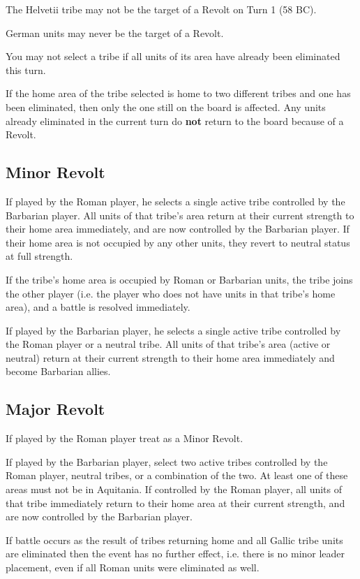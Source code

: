The Helvetii tribe may not be the target of a Revolt on Turn 1 (58 BC).

German units may never be the target of a Revolt.

You may not select a tribe if all units of its area have already been eliminated this turn.

If the home area of the tribe selected is home to two different tribes and one has been eliminated, then only the one still on the board is affected. Any units already eliminated in the current turn do \textbf{not} return to the board because of a Revolt.

\subsection{Minor Revolt}
If played by the Roman player, he selects a single active tribe controlled
by the Barbarian player. All units of that tribe's area return at their current strength to their home area immediately, and are now controlled by the Barbarian player. If their home area is not occupied by any other units, they revert to neutral status at full strength.

If the tribe’s home area is occupied by Roman or Barbarian units, the tribe joins the other player (i.e. the player who does not have units in that tribe’s home area), and a battle is resolved immediately.

If played by the Barbarian player, he selects a single active tribe
controlled by the Roman player or a neutral tribe. All units of that
tribe's area (active or neutral) return at their current strength to their home area immediately and become Barbarian allies.

\subsection{Major Revolt}
If played by the Roman player treat as a Minor Revolt.

If played by the Barbarian player, select two active tribes controlled by the Roman player, neutral tribes, or a combination of the two. At least one of these areas must not be in Aquitania. If controlled by the Roman player, all units of that tribe immediately return to their home area at their current strength, and are now controlled by the Barbarian player.

If battle occurs as the result of tribes returning home and all Gallic tribe units are eliminated then the event has no further effect, i.e. there is no minor leader placement, even if all Roman units were eliminated as well.


